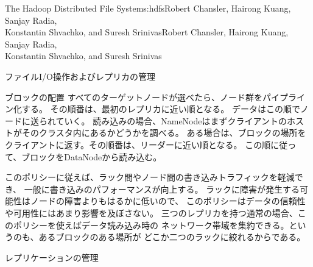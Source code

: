 \begin{aosachaptertoc}{The Hadoop Distributed File System}{s:hdfs}{Robert Chansler, Hairong Kuang, Sanjay Radia, \\ Konstantin Shvachko, and Suresh Srinivas}{Robert Chansler, Hairong Kuang, Sanjay Radia, \\ \hspace*{0.9cm} Konstantin Shvachko, and Suresh Srinivas}
\begin{aosasect1}{ファイルI/O操作およびレプリカの管理}
\begin{aosasect2}{ブロックの配置}
すべてのターゲットノードが選べたら、ノード群をパイプライン化する。
その順番は、最初のレプリカに近い順となる。
データはこの順でノードに送られていく。
読み込みの場合、NameNodeはまずクライアントのホストがそのクラスタ内にあるかどうかを調べる。
ある場合は、ブロックの場所をクライアントに返す。その順番は、リーダーに近い順となる。
この順に従って、ブロックをDataNodeから読み込む。

このポリシーに従えば、ラック間やノード間の書き込みトラフィックを軽減でき、
一般に書き込みのパフォーマンスが向上する。
ラックに障害が発生する可能性はノードの障害よりもはるかに低いので、
このポリシーはデータの信頼性や可用性にはあまり影響を及ぼさない。
三つのレプリカを持つ通常の場合、このポリシーを使えばデータ読み込み時の
ネットワーク帯域を集約できる。というのも、あるブロックのある場所が
どこか二つのラックに絞れるからである。

\end{aosasect2}

\begin{aosasect2}{レプリケーションの管理}


\end{aosasect2}
\end{aosasect1}
\end{aosachaptertoc}
